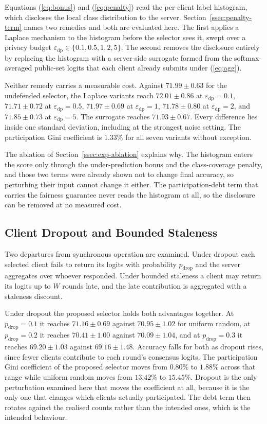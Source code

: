 \documentclass[journal]{IEEEtran}
\newcommand{\rev}[1]{#1}
\begin{document}
\rev{Equations (\ref{eq:bonus}) and (\ref{eq:penalty}) read the per-client label histogram, which discloses the local class distribution to the server. Section~\ref{ssec:penalty-term} names two remedies and both are evaluated here. The first applies a Laplace mechanism to the histogram before the selector sees it, swept over a privacy budget $\varepsilon_{\mathrm{dp}} \in \{0.1, 0.5, 1, 2, 5\}$. The second removes the disclosure entirely by replacing the histogram with a server-side surrogate formed from the softmax-averaged public-set logits that each client already submits under (\ref{eq:agg}).}

\rev{Neither remedy carries a measurable cost. Against $71.99 \pm 0.63$ for the undefended selector, the Laplace variants reach $72.01 \pm 0.86$ at $\varepsilon_{\mathrm{dp}} = 0.1$, $71.71 \pm 0.72$ at $\varepsilon_{\mathrm{dp}} = 0.5$, $71.97 \pm 0.69$ at $\varepsilon_{\mathrm{dp}} = 1$, $71.78 \pm 0.80$ at $\varepsilon_{\mathrm{dp}} = 2$, and $71.85 \pm 0.73$ at $\varepsilon_{\mathrm{dp}} = 5$. The surrogate reaches $71.93 \pm 0.67$. Every difference lies inside one standard deviation, including at the strongest noise setting. The participation Gini coefficient is $1.33\%$ for all seven variants without exception.}

\rev{The ablation of Section~\ref{ssec:exp-ablation} explains why. The histogram enters the score only through the under-prediction bonus and the class-coverage penalty, and those two terms were already shown not to change final accuracy, so perturbing their input cannot change it either. The participation-debt term that carries the fairness guarantee never reads the histogram at all, so the disclosure can be removed at no measured cost.}

\subsection{Client Dropout and Bounded Staleness}
\label{ssec:exp-dropout}

\rev{Two departures from synchronous operation are examined. Under dropout each selected client fails to return its logits with probability $p_{\text{drop}}$ and the server aggregates over whoever responded. Under bounded staleness a client may return its logits up to $W$ rounds late, and the late contribution is aggregated with a staleness discount.}

\rev{Under dropout the proposed selector holds both advantages together. At $p_{\text{drop}} = 0.1$ it reaches $71.16 \pm 0.69$ against $70.95 \pm 1.02$ for uniform random, at $p_{\text{drop}} = 0.2$ it reaches $70.41 \pm 1.00$ against $70.09 \pm 1.04$, and at $p_{\text{drop}} = 0.3$ it reaches $69.20 \pm 1.03$ against $69.16 \pm 1.48$. Accuracy falls for both as dropout rises, since fewer clients contribute to each round's consensus logits. The participation Gini coefficient of the proposed selector moves from $0.80\%$ to $1.88\%$ across that range while uniform random moves from $13.42\%$ to $15.45\%$. Dropout is the only perturbation examined here that moves the coefficient at all, because it is the only one that changes which clients actually participated. The debt term then rotates against the realised counts rather than the intended ones, which is the intended behaviour.}
\end{document}
